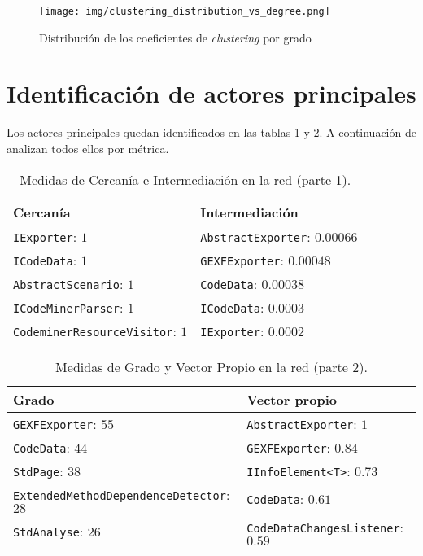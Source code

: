 \documentclass[12pt,letterpaper]{article}
\begin{document}
\begin{figure}[htp]
    \centering
    \texttt{[image: img/clustering\_distribution\_vs\_degree.png]}
    \caption{Distribución de los coeficientes de \textit{clustering} por grado}
    \label{fig:clustering_coeff_degree}
\end{figure}

\section{Identificación de actores principales}
Los actores principales quedan identificados en las tablas \ref{tab:centrality1} y \ref{tab:centrality2}. A continuación de analizan todos ellos por métrica.
\begin{table}[htp]
    \centering
    \small
    \begin{tabular}{ll}
        \hline
        \textbf{Cercanía}                      & \textbf{Intermediación}              \\
        \hline
        \texttt{IExporter}: $1$                & \texttt{AbstractExporter}: $0.00066$ \\
        \texttt{ICodeData}: $1$                & \texttt{GEXFExporter}: $0.00048$     \\
        \texttt{AbstractScenario}: $1$         & \texttt{CodeData}: $0.00038$         \\
        \texttt{ICodeMinerParser}: $1$         & \texttt{ICodeData}: $0.0003$         \\
        \texttt{CodeminerResourceVisitor}: $1$ & \texttt{IExporter}: $0.0002$         \\
        \hline
    \end{tabular}
    \caption{Medidas de Cercanía e Intermediación en la red (parte 1).}
    \label{tab:centrality1}
\end{table}

\begin{table}[htp]
    \centering
    \small
    \begin{tabular}{ll}
        \hline
        \textbf{Grado}                                  & \textbf{Vector propio}                   \\
        \hline
        \texttt{GEXFExporter}: $55$                     & \texttt{AbstractExporter}: $1$           \\
        \texttt{CodeData}: $44$                         & \texttt{GEXFExporter}: $0.84$            \\
        \texttt{StdPage}: $38$                          & \texttt{IInfoElement<T>}: $0.73$         \\
        \texttt{ExtendedMethodDependenceDetector}: $28$ & \texttt{CodeData}: $0.61$                \\
        \texttt{StdAnalyse}: $26$                       & \texttt{CodeDataChangesListener}: $0.59$ \\
        \hline
    \end{tabular}
    \caption{Medidas de Grado y Vector Propio en la red (parte 2).}
    \label{tab:centrality2}
\end{table}
\end{document}

